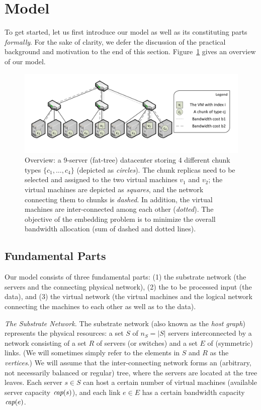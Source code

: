 \documentclass[9pt]{sigcomm-alternate}
\newcommand{\capacity}{\emph{cap}}
\begin{document}
\section{Model}\label{sec:model}

To get started, let us first introduce our model as well as its constituting parts \emph{formally}.
For the sake of clarity, we defer the discussion of the practical background and motivation
to the end of this section. Figure~\ref{fig:overview} gives an overview of our model.

\begin{figure}[t]
\centering
\includegraphics[width=0.99\columnwidth]{figs/overview-fig.pdf}
\caption{Overview: a 9-server (fat-tree) datacenter storing 4 different chunk
types $\{c_1,\ldots,c_4\}$ (depicted as \emph{circles}). The chunk replicas need to be selected and assigned to the two
 virtual machines $v_1$ and $v_2$; the virtual machines are depicted as \emph{squares}, and
 the network connecting them to chunks is \emph{dashed}. In addition, the virtual machines are inter-connected among
 each other (\emph{dotted}). The objective of the embedding problem is to minimize the overall bandwidth allocation
 (sum of dashed and dotted lines).}
\label{fig:overview}
\end{figure}



\subsection{Fundamental Parts}

Our model consists of three fundamental parts: (1) the substrate network (the servers
and the connecting physical network),
(2) the to be processed input (the data), and
(3) the virtual network (the virtual machines and the logical network connecting the machines to each other
as well as to the data).

\emph{The Substrate Network.} The substrate network (also known as the \emph{host graph}) represents the physical resources:
a set $S$ of $n_S=|S|$ servers interconnected by a network consisting of a set $R$ of servers (or switches)
and a set $E$ of (symmetric) links. (We will sometimes simply refer to the elements in $S$ and $R$
as the \emph{vertices}.) We will assume that the inter-connecting network forms an (arbitrary, not necessarily balanced
or regular) tree,
where the servers are located at the tree leaves.
Each server $s\in S$ can host a certain number
of virtual machines (available server capacity $\capacity(s)$), and each link $e\in E$ has a certain bandwidth
capacity $\capacity(e)$.
\end{document}
